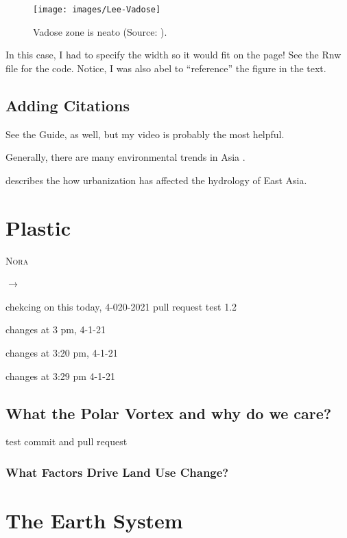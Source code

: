 \documentclass{book}\usepackage{knitr}
\makeatletter
\newcommand{\chapterauthor}[1]{%
  {\parindent0pt\vspace*{-25pt}%
  \linespread{1.1}\large\scshape#1%
  \par\nobreak\vspace*{35pt}}
  \@afterheading%
}
\makeatother
\begin{document}
\begin{figure}
\texttt{[image: images/Lee-Vadose]}
\caption{Vadose zone is neato (Source: \citet{lee2017fifty}).}
\label{fig:vadose}
\end{figure}

In this case, I had to specify the width so it would fit on the page!  See the Rnw file for the code. Notice, I was also abel to ``reference'' the figure in the text.

\section{Adding Citations}

See the Guide, as well, but my video is probably the most helpful.


Generally, there are many environmental trends in Asia \citep{imura2005urban}.

\citet{imura2005urban} describes the how urbanization has affected the hydrology of East Asia. 
 

\chapter{Plastic}

\chapterauthor{Nora}

$\rightarrow$

chekcing on this today, 4-020-2021
pull request test 1.2 

changes at 3 pm, 4-1-21

changes at 3:20 pm, 4-1-21

changes at 3:29 pm 4-1-21



\section{What the Polar Vortex and why do we care?}

test commit and pull request 


\subsection{What Factors Drive Land Use Change?}





\mainmatter


\chapter{The Earth System}\label{earthsystem}
\end{document}

